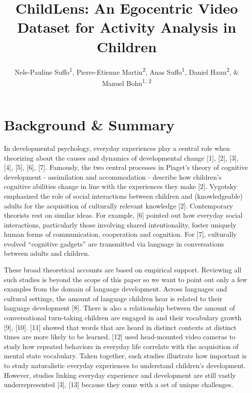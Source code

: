 \documentclass[
  man,floatsintext]{apa6}
\title{ChildLens: An Egocentric Video Dataset for Activity Analysis in Children}
\author{Nele-Pauline Suffo\textsuperscript{1}, Pierre-Etienne Martin\textsuperscript{2}, Anas Suffo\textsuperscript{1}, Daniel Haun\textsuperscript{2}, \& Manuel Bohn\textsuperscript{1, 2}}
\date{}
\affiliation{\vspace{0.5cm}\textsuperscript{1} Institute of Psychology in Education, Leuphana University Lüneburg\\\textsuperscript{2} Max Planck Institute for Evolutionary Anthropology}
\begin{document}
\maketitle

\section{Background \& Summary}\label{background-summary}

In developmental psychology, everyday experiences play a central role when theorizing about the causes and dynamics of developmental change {[}1{]}, {[}2{]}, {[}3{]}, {[}4{]}, {[}5{]}, {[}6{]}, {[}7{]}. Famously, the two central processes in Piaget's theory of cognitive development - assimilation and accommodation - describe how children's cognitive abilities change in line with the experiences they make {[}2{]}. Vygotsky emphasized the role of social interactions between children and (knowledgeable) adults for the acquisition of culturally relevant knowledge {[}2{]}. Contemporary theorists rest on similar ideas. For example, {[}6{]} pointed out how everyday social interactions, particularly those involving shared intentionality, foster uniquely human forms of communication, cooperation and cognition. For {[}7{]}, culturally evolved ``cognitive gadgets'' are transmitted via language in conversations between adults and children.

These broad theoretical accounts are based on empirical support. Reviewing all such studies is beyond the scope of this paper so we want to point out only a few examples from the domain of language development. Across languages and cultural settings, the amount of language children hear is related to their language development {[}8{]}. There is also a relationship between the amount of conversational turn-taking children are engaged in and their vocabulary growth {[}9{]}, {[}10{]}. {[}11{]} showed that words that are heard in distinct contexts at distinct times are more likely to be learned. {[}12{]} used head-mounted video cameras to study how repeated behaviors in everyday life correlate with the acquisition of mental state vocabulary. Taken together, such studies illustrate how important is to study naturalistic everyday experiences to understand children's development. However, studies linking everyday experience and development are still vastly underrepresented {[}3{]}, {[}13{]} because they come with a set of unique challenges.
\end{document}
